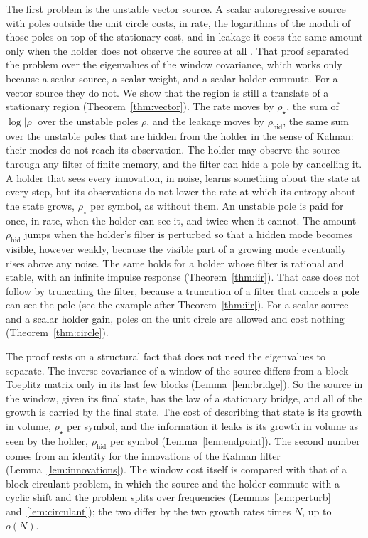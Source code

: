 \documentclass[11pt,onecolumn]{IEEEtran}
\newcommand{\rhid}{\rho_{\mathrm{hid}}}
\begin{document}
The first problem is the unstable vector source. A scalar autoregressive source
with poles outside the unit circle costs, in rate, the logarithms of the
moduli of those poles on top of the stationary cost, and in leakage it
costs the same amount only when the holder does not observe the source
at all \cite[Theorem~26]{part3}. That proof separated the problem over
the eigenvalues of the window covariance, which works only because a
scalar source, a scalar weight, and a scalar holder commute. For a
vector source they do not. We show that the region is still a translate
of a stationary region (Theorem~\ref{thm:vector}). The rate moves by
$\rho_\star$, the sum of $\log|\rho|$ over the unstable poles $\rho$,
and the leakage moves by $\rhid$, the same sum over the unstable poles
that are hidden from the holder in the sense of Kalman: their modes do
not reach its observation. The holder may observe the source through
any filter of finite memory, and the filter can hide a pole by
cancelling it. A holder that sees every innovation, in noise, learns
something about the state at every step, but its observations do not
lower the rate at which its entropy about the state grows, $\rho_\star$
per symbol, as without them. An unstable pole is paid for once, in rate,
when the holder can see it, and twice when it cannot. The amount $\rhid$
jumps when the holder's filter is perturbed so that a hidden mode
becomes visible, however weakly, because the visible part of a growing
mode eventually rises above any noise. The same holds for a holder whose
filter is rational and stable, with an infinite impulse response
(Theorem~\ref{thm:iir}). That case does not follow by truncating the
filter, because a truncation of a filter that cancels a pole can see
the pole (see the example after Theorem~\ref{thm:iir}). For a scalar
source and a scalar holder gain, poles on the
unit circle are allowed and cost nothing (Theorem~\ref{thm:circle}).

The proof rests on a structural fact that does not need the eigenvalues
to separate. The inverse covariance of a window of the source differs
from a block Toeplitz matrix only in its last few blocks
(Lemma~\ref{lem:bridge}). So the source in the window, given its final
state, has the law of a stationary bridge, and all of the growth is
carried by the final state. The cost of describing that state is its
growth in volume, $\rho_\star$ per symbol, and the information it leaks
is its growth in volume as seen by the holder, $\rhid$ per symbol
(Lemma~\ref{lem:endpoint}). The second number comes from an identity
for the innovations of the Kalman filter (Lemma~\ref{lem:innovations}).
The window cost itself is compared with that of a block circulant
problem, in which the source and the holder commute with a cyclic
shift and the problem splits over frequencies
(Lemmas~\ref{lem:perturb} and~\ref{lem:circulant}); the two differ by
the two growth rates times $N$, up to $o(N)$.
\end{document}
